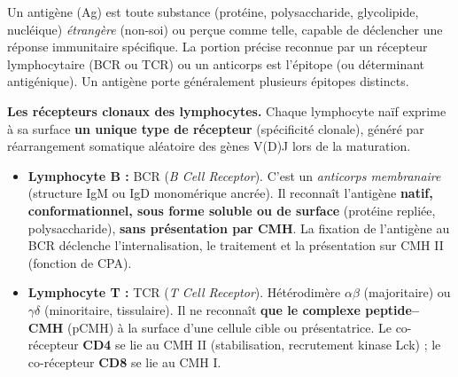\documentclass[11pt]{article}
\newcommand{\cle}[1]{{\popxbold\color{popdark}#1}}
\begin{document}
\begin{definition}
Un \cle{antigène} (Ag) est toute substance (protéine, polysaccharide, glycolipide, nucléique) \emph{étrangère} (non-soi) ou perçue comme telle, capable de déclencher une réponse immunitaire spécifique. La portion précise reconnue par un récepteur lymphocytaire (BCR ou TCR) ou un anticorps est l'\cle{épitope} (ou déterminant antigénique). Un antigène porte généralement plusieurs épitopes distincts.
\end{definition}

\textbf{Les récepteurs clonaux des lymphocytes.} Chaque lymphocyte naïf exprime à sa surface \textbf{un unique type de récepteur} (spécificité clonale), généré par réarrangement somatique aléatoire des gènes V(D)J lors de la maturation.

\begin{itemize}
\item \textbf{Lymphocyte B :} \cle{BCR} (\emph{B Cell Receptor}). C'est un \emph{anticorps membranaire} (structure IgM ou IgD monomérique ancrée). Il reconnaît l'antigène \textbf{natif, conformationnel, sous forme soluble ou de surface} (protéine repliée, polysaccharide), \textbf{sans présentation par CMH}. La fixation de l'antigène au BCR déclenche l'internalisation, le traitement et la présentation sur CMH II (fonction de CPA).
\item \textbf{Lymphocyte T :} \cle{TCR} (\emph{T Cell Receptor}). Hétérodimère $\alpha\beta$ (majoritaire) ou $\gamma\delta$ (minoritaire, tissulaire). Il ne reconnaît \textbf{que le complexe peptide--CMH} (pCMH) à la surface d'une cellule cible ou présentatrice. Le co-récepteur \textbf{CD4} se lie au CMH II (stabilisation, recrutement kinase Lck) ; le co-récepteur \textbf{CD8} se lie au CMH I.
\end{itemize}
\end{document}
